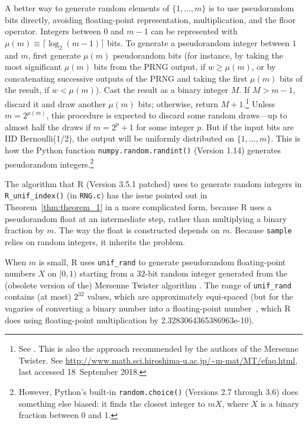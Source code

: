\documentclass[12pt]{article}
\begin{document}
A better way to generate random elements of $\{1, \dots, m\}$ is to use pseudorandom bits directly,
avoiding floating-point representation, multiplication, and the floor operator. 
Integers between $0$ and $m-1$ can be represented with $\mu(m) \equiv \lceil \log_2(m-1) \rceil$ bits. 
To generate a pseudorandom integer between $1$ and $m$, first generate 
$\mu(m)$ pseudorandom bits (for instance, by taking the most significant $\mu(m)$ bits from the PRNG output, if $w \ge \mu(m)$, or by concatenating successive outputs of the PRNG and taking the
first $\mu(m)$ bits of the result, if $w < \mu(m)$).
Cast the result as a binary integer $M$.  
If $M > m-1$, discard it and draw another $\mu(m)$ bits; otherwise, return $M+1$.\footnote{%
   See \citet[p.114]{knuth_art_1997}.
   This is also the approach recommended by the authors of the Mersenne Twister. See
   \url{http://www.math.sci.hiroshima-u.ac.jp/~m-mat/MT/efaq.html}, last accessed 18~September 2018.
}
Unless $m = 2^{\mu(m)}$, this procedure is expected to discard some random draws---up to almost 
half the draws if $m = 2^p+1$ for some integer $p$.
But if the input bits are IID Bernoulli(1/2), the output will be uniformly distributed on $\{1, \ldots, m\}$.
This is how the Python function \texttt{numpy.random.randint()} (Version 1.14) generates pseudorandom integers.\footnote{%
  However, Python's built-in \texttt{random.choice()} (Versions 2.7 through 3.6) does 
  something else biased: it finds the closest integer to $mX$, where $X$ is a binary fraction 
  between 0 and 1.
}

The algorithm that R (Version 3.5.1 patched) \citep{R_2018} uses to generate random integers
in \texttt{R\_unif\_index()} (in \texttt{RNG.c})
has the issue pointed out in Theorem~\ref{thm:theorem_1} in a more complicated form, 
because R uses a pseudorandom float at an intermediate step, rather than multiplying a binary fraction
by $m$.
The way the float is constructed depends on $m$.
Because \texttt{sample} relies on random integers, it inherits the problem.

When $m$ is small, R uses \texttt{unif\_rand} to generate pseudorandom floating-point 
numbers $X$ on $[0, 1)$ starting from a $32$-bit random integer generated from the
(obsolete version of the) Mersenne Twister algorithm \citep{mt1998}.
The range of \texttt{unif\_rand} contains 
(at most) $2^{32}$ values, which are approximately equi-spaced (but for the vagaries of converting
a binary number into a floating-point number~\citep{goldberg91}, which
R does using floating-point multiplication by 2.3283064365386963e-10).
\end{document}
